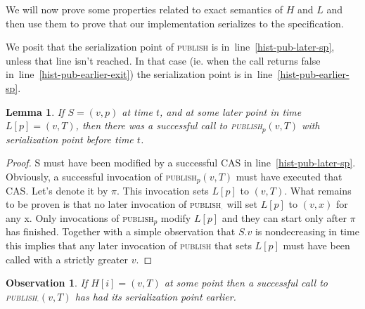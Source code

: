 \documentclass[a4paper,11pt]{article}
\newtheorem{lemma}{Lemma}
\newtheorem{observation}{Observation}
\newcommand{\fn}[1]{\textsc{#1}}
\begin{document}
We will now prove some properties related to exact semantics of $H$ and $L$ and then use them to prove that our implementation serializes to the specification.



We posit that the serialization point of \fn{publish} is in~line~\ref{hist-pub-later-sp}, unless that line isn't reached. In that case (ie. when the call returns false in~line~\ref{hist-pub-earlier-exit})
the serialization point is in~line~\ref{hist-pub-earlier-sp}.


\begin{lemma}\label{hist-cv-latest}
If $S = (v, p)$ at time $t$, and at some later point in time $L[p] = (v, T)$, then there was a successful call to \fn{publish$_p$}$(v, T)$ with serialization point before time $t$.
\end{lemma}
\begin{proof}
S must have been modified by a successful CAS in line~\ref{hist-pub-later-sp}. Obviously, a successful invocation of \fn{publish$_p$}$(v, T)$ must have executed that CAS. Let's denote it by $\pi$.
This invocation sets $L[p]$ to $(v, T)$. What remains to be proven is that no later invocation of \fn{publish$_\cdot$} will set $L[p]$ to $(v, x)$ for any x.
Only invocations of \fn{publish$_p$} modify $L[p]$ and they can start only after $\pi$ has finished. Together with a simple observation that $S.v$ is nondecreasing in time this implies
that any later invocation of \fn{publish} that sets $L[p]$ must have been called with a strictly greater $v$.
\end{proof}

\begin{observation}
\label{obs-hist-is-correct}
If $H[i] = (v, T)$ at some point then a successful call to \fn{publish$_\cdot$}$(v, T)$ has had its serialization point earlier.
\end{observation}
\end{document}
